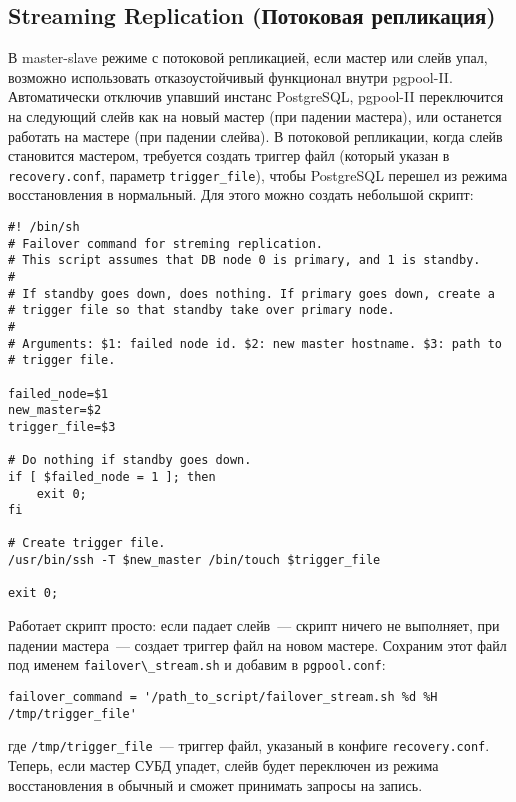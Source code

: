 \subsection{Streaming Replication (Потоковая репликация)}

В master-slave режиме с потоковой репликацией, если мастер или слейв упал, возможно использовать отказоустойчивый функционал внутри pgpool-II. Автоматически отключив упавший инстанс PostgreSQL, pgpool-II переключится на следующий слейв как на новый мастер (при падении мастера), или останется работать на мастере (при падении слейва). В потоковой репликации, когда слейв становится мастером, требуется создать триггер файл (который указан в \lstinline!recovery.conf!, параметр \lstinline!trigger_file!), чтобы PostgreSQL перешел из режима восстановления в нормальный. Для этого можно создать небольшой скрипт:

\begin{lstlisting}[label=lst:pgpool40,caption=Скрипт выполняется при падении нода PostgreSQL]
#! /bin/sh
# Failover command for streming replication.
# This script assumes that DB node 0 is primary, and 1 is standby.
#
# If standby goes down, does nothing. If primary goes down, create a
# trigger file so that standby take over primary node.
#
# Arguments: $1: failed node id. $2: new master hostname. $3: path to
# trigger file.

failed_node=$1
new_master=$2
trigger_file=$3

# Do nothing if standby goes down.
if [ $failed_node = 1 ]; then
	exit 0;
fi

# Create trigger file.
/usr/bin/ssh -T $new_master /bin/touch $trigger_file

exit 0;
\end{lstlisting}

Работает скрипт просто: если падает слейв~--- скрипт ничего не выполняет, при падении мастера~--- создает триггер файл на новом мастере. Сохраним этот файл под именем \lstinline!failover\_stream.sh! и добавим в \lstinline!pgpool.conf!:

\begin{lstlisting}[label=lst:pgpool41,caption=Что выполнять при падении нода]
failover_command = '/path_to_script/failover_stream.sh %d %H /tmp/trigger_file'
\end{lstlisting}

где \lstinline!/tmp/trigger_file!~--- триггер файл, указаный в конфиге \lstinline!recovery.conf!. Теперь, если мастер СУБД упадет, слейв будет переключен из режима восстановления в обычный и сможет принимать запросы на запись.



